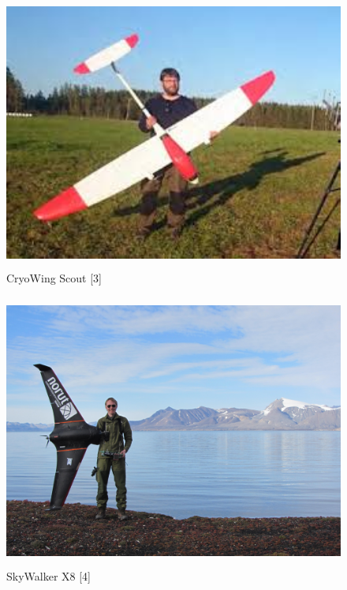 \documentclass[12pt, a4paper]{article}
\begin{document}
\begin{figure}[h!]
	\centering
	\includegraphics[width=.6\textwidth, height=9cm]{bilder/CryoWing_Scout.jpeg}
	\caption{CryoWing Scout [3]}
\end{figure}

\newpage

\begin{figure}[hpbt]
	\centering
	\includegraphics[width=.6\textwidth, height=9cm]{bilder/SkyWalker_X8.jpg}
	\caption{SkyWalker X8 [4]}
\end{figure}
\end{document}
